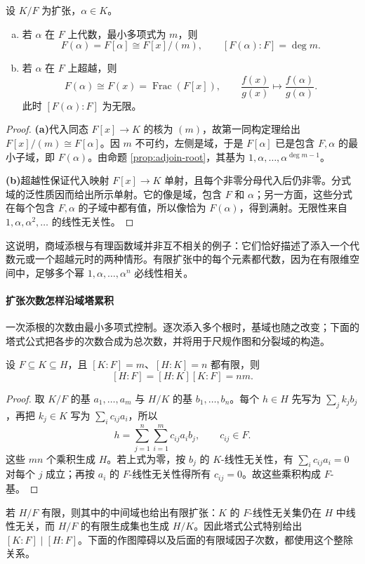 \documentclass[lang=cn,a4paper,fontset=none,zihao=false,10pt,openany,twoside]{beautybook}
\numberwithin{algorithm}{chapter}
\begin{document}
\begin{proposition}[单扩张的两种模型]\label{prop:simple-extension-model}
设 $K/F$ 为扩张，$\alpha\in K$。
\begin{enumerate}[(a)]
\item 若 $\alpha$ 在 $F$ 上代数，最小多项式为 $m$，则
\[
 F(\alpha)=F[\alpha]\cong F[x]/(m),\qquad [F(\alpha):F]=\deg m.
\]
\item 若 $\alpha$ 在 $F$ 上超越，则
\[
 F(\alpha)\cong F(x)=\operatorname{Frac}(F[x]),\qquad
 \frac{f(x)}{g(x)}\longmapsto\frac{f(\alpha)}{g(\alpha)}.
\]
此时 $[F(\alpha):F]$ 为无限。
\end{enumerate}
\end{proposition}
\begin{proof}
\par\smallskip\noindent\textbf{(a)}\quad 代入同态 $F[x]\to K$ 的核为 $(m)$，故第一同构定理给出 $F[x]/(m)\cong F[\alpha]$。因 $m$ 不可约，左侧是域，于是 $F[\alpha]$ 已是包含 $F,\alpha$ 的最小子域，即 $F(\alpha)$。由命题 \ref{prop:adjoin-root}，其基为 $1,\alpha,\ldots,\alpha^{\deg m-1}$。
\par\smallskip\noindent\textbf{(b)}\quad 超越性保证代入映射 $F[x]\to K$ 单射，且每个非零分母代入后仍非零。分式域的泛性质因而给出所示单射。它的像是域，包含 $F$ 和 $\alpha$；另一方面，这些分式在每个包含 $F,\alpha$ 的子域中都有值，所以像恰为 $F(\alpha)$，得到满射。无限性来自 $1,\alpha,\alpha^2,\ldots$ 的线性无关性。
\end{proof}
这说明，商域添根与有理函数域并非互不相关的例子：它们恰好描述了添入一个代数元或一个超越元时的两种情形。有限扩张中的每个元素都代数，因为在有限维空间中，足够多个幂 $1,\alpha,\ldots,\alpha^n$ 必线性相关。

\paragraph{扩张次数怎样沿域塔累积}
一次添根的次数由最小多项式控制。逐次添入多个根时，基域也随之改变；下面的塔式公式把各步的次数合成为总次数，并将用于尺规作图和分裂域的构造。
\begin{theorem}[塔式公式]\label{thm:field-tower}
设 $F\subseteq K\subseteq H$，且 $[K:F]=m$、$[H:K]=n$ 都有限，则
\[
 [H:F]=[H:K][K:F]=nm.
\]
\end{theorem}
\begin{proof}
取 $K/F$ 的基 $a_1,\ldots,a_m$ 与 $H/K$ 的基 $b_1,\ldots,b_n$。每个 $h\in H$ 先写为 $\sum_j k_jb_j$，再把 $k_j\in K$ 写为 $\sum_i c_{ij}a_i$，所以
\[
 h=\sum_{j=1}^n\sum_{i=1}^m c_{ij}a_ib_j,\qquad c_{ij}\in F.
\]
这些 $mn$ 个乘积生成 $H$。若上式为零，按 $b_j$ 的 $K$-线性无关性，有 $\sum_i c_{ij}a_i=0$ 对每个 $j$ 成立；再按 $a_i$ 的 $F$-线性无关性得所有 $c_{ij}=0$。故这些乘积构成 $F$-基。
\end{proof}
若 $H/F$ 有限，则其中的中间域也给出有限扩张：$K$ 的 $F$-线性无关集仍在 $H$ 中线性无关，而 $H/F$ 的有限生成集也生成 $H/K$。因此塔式公式特别给出 $[K:F]\mid[H:F]$。下面的作图障碍以及后面的有限域因子次数，都使用这个整除关系。
\end{document}

